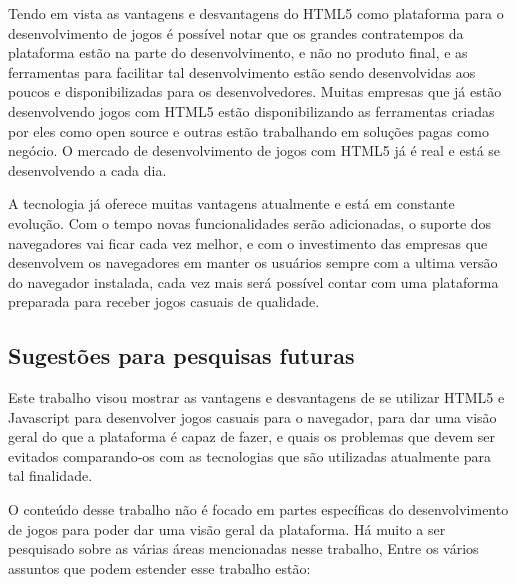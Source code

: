 Tendo em vista as vantagens e desvantagens do HTML5 como plataforma
para o desenvolvimento de jogos é possível notar que os grandes
contratempos da plataforma estão na parte do desenvolvimento, e não no
produto final, e as ferramentas para facilitar tal desenvolvimento
estão sendo desenvolvidas aos poucos e disponibilizadas para os
desenvolvedores. Muitas empresas que já estão desenvolvendo jogos com HTML5
estão disponibilizando as ferramentas criadas por eles como open source
e outras estão trabalhando em soluções pagas como negócio.
O mercado de desenvolvimento de jogos com HTML5 já é real e está se
desenvolvendo a cada dia.

A tecnologia já oferece muitas vantagens atualmente e está em
constante evolução. Com o tempo novas funcionalidades serão
adicionadas, o suporte dos navegadores vai ficar cada vez melhor, e
com o investimento das empresas que desenvolvem os navegadores em manter
os usuários sempre com a ultima versão do navegador instalada, cada vez
mais será possível contar com uma plataforma preparada para receber
jogos casuais de qualidade.

\subsection{Sugestões para pesquisas futuras}

Este trabalho visou mostrar as vantagens e desvantagens de se utilizar
HTML5 e Javascript para desenvolver jogos casuais para o navegador,
para dar uma visão geral do que a plataforma é capaz de fazer, e quais
os problemas que devem ser evitados comparando-os com as tecnologias
que são utilizadas atualmente para tal finalidade.

O conteúdo desse trabalho não é focado em partes específicas do
desenvolvimento de jogos para poder dar uma visão geral da plataforma.
Há muito a ser pesquisado sobre as várias áreas mencionadas nesse
trabalho, Entre os vários assuntos que podem estender esse trabalho
estão:

